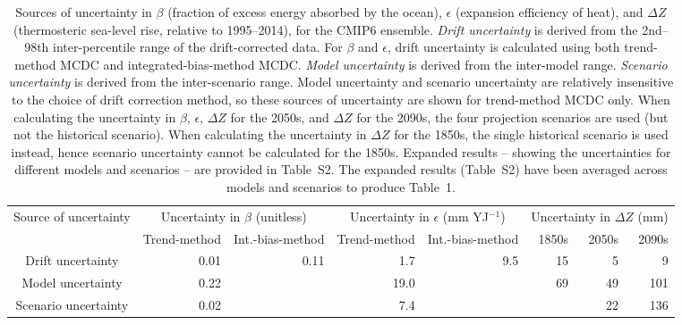 \begin{table*}[t]
\centering
\caption{Sources of uncertainty in $\beta$ (fraction of excess energy absorbed by the ocean), $\epsilon$ (expansion efficiency of heat), and ${\Delta}Z$ (thermosteric sea-level rise, relative to 1995--2014), for the CMIP6 ensemble. \emph{Drift uncertainty} is derived from the 2nd--98th inter-percentile range of the drift-corrected data. For $\beta$ and $\epsilon$, drift uncertainty is calculated using both trend-method MCDC and integrated-bias-method MCDC. \emph{Model uncertainty} is derived from the inter-model range. \emph{Scenario uncertainty} is derived from the inter-scenario range. Model uncertainty and scenario uncertainty are relatively insensitive to the choice of drift correction method, so these sources of uncertainty are shown for trend-method MCDC only. When calculating the uncertainty in $\beta$, $\epsilon$, ${\Delta}Z$ for the 2050s, and ${\Delta}Z$ for the 2090s, the four projection scenarios are used (but not the historical scenario). When calculating the uncertainty in ${\Delta}Z$ for the 1850s, the single historical scenario is used instead, hence scenario uncertainty cannot be calculated for the 1850s. Expanded results -- showing the uncertainties for different models and scenarios -- are provided in Table~S2. The expanded results (Table~S2) have been averaged across models and scenarios to produce Table~1.}
\begin{tabular}{c|rr|rr|rrr}
\toprule
Source of uncertainty & \multicolumn{2}{c|}{Uncertainty in $\beta$ (unitless)} & \multicolumn{2}{c|}{Uncertainty in $\epsilon$ (mm YJ$^{-1}$)} & \multicolumn{3}{c}{Uncertainty in ${\Delta}Z$ (mm)} \\
 & Trend-method & Int.-bias-method & Trend-method & Int.-bias-method & 1850s & 2050s & 2090s \\
\midrule
Drift uncertainty & 0.01 & 0.11 & 1.7 & 9.5 & 15 & 5 & 9 \\
Model uncertainty & 0.22 &  & 19.0 &  & 69 & 49 & 101 \\
Scenario uncertainty & 0.02 &  & 7.4 &  &  & 22 & 136 \\
\bottomrule
\end{tabular}
\end{table*}
